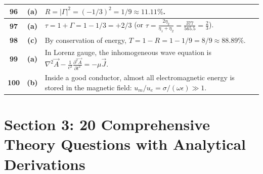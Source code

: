 {\begin{tabularx}{\textwidth}{|c|c|X|}
\textbf{96} & \textbf{(a)} & $R = |\Gamma|^2 = (-1/3)^2 = 1/9 \approx 11.11\%$. \\ \hline
\textbf{97} & \textbf{(a)} & $\tau = 1 + \Gamma = 1 - 1/3 = +2/3$ (or $\tau = \frac{2\eta_2}{\eta_1+\eta_2} = \frac{377}{565.5} = \frac{2}{3}$). \\ \hline
\textbf{98} & \textbf{(c)} & By conservation of energy, $T = 1 - R = 1 - 1/9 = 8/9 \approx 88.89\%$. \\ \hline
\textbf{99} & \textbf{(a)} & In Lorenz gauge, the inhomogeneous wave equation is $\nabla^2 \vec{A} - \frac{1}{c^2}\frac{\partial^2\vec{A}}{\partial t^2} = -\mu \vec{J}$. \\ \hline
\textbf{100} & \textbf{(b)} & Inside a good conductor, almost all electromagnetic energy is stored in the magnetic field: $u_m / u_e = \sigma/(\omega\epsilon) \gg 1$. \\ \hline
\end{tabularx}
}


\newpage
\section{Section 3: 20 Comprehensive Theory Questions with Analytical Derivations}

